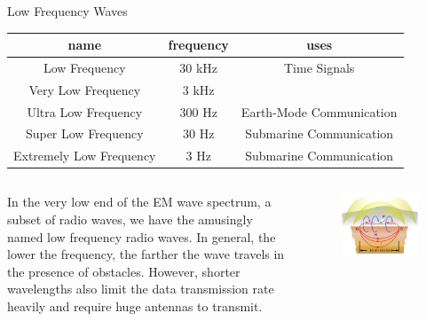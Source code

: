 \documentclass{beamer}
\begin{document}
\begin{frame}{Low Frequency Waves}
	\begin{center}	
	\begin{tabular}{ccc}
		name & frequency & uses \\ \hline
		Low Frequency & 30 kHz & Time Signals  \\
		Very Low Frequency & 3 kHz & \\
		Ultra Low Frequency & 300 Hz & Earth-Mode Communication\\
		Super Low Frequency & 30 Hz & Submarine Communication \\
		Extremely Low Frequency & 3 Hz & Submarine Communication
	\end{tabular} 
	\end{center}
	
\begin{columns}
	\begin{column}{.7\textwidth}
	In the very low end of the EM wave spectrum, a subset of radio waves, we have the amusingly named low frequency radio waves. In general, the lower the frequency, the farther the wave travels in the presence of obstacles. However, shorter wavelengths also limit the data transmission rate heavily and require huge antennas to transmit.
	\end{column}
	\begin{column}{.3\textwidth}
	\begin{figure}
	    \centering
	    \includegraphics[scale=.08]{elf_antenna.png}
	    \label{fig:elf_antenna}
	\end{figure}
	\end{column}
\end{columns}
\end{frame}
\end{document}
